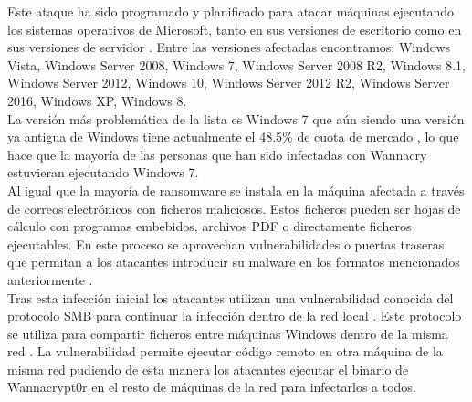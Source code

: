 Este ataque ha sido programado y planificado para atacar máquinas ejecutando los sistemas operativos de Microsoft, tanto en sus versiones de escritorio como en sus versiones de servidor \cite{plataformas-contagio-2}. Entre las versiones afectadas encontramos: Windows Vista, Windows Server 2008, Windows 7, Windows Server 2008 R2, Windows 8.1, Windows Server 2012, Windows 10, Windows Server 2012 R2, Windows Server 2016, Windows XP, Windows 8.\\
La versión más problemática de la lista es Windows 7 que aún siendo una versión ya antigua de Windows tiene actualmente el 48.5\% de cuota de mercado \cite{plataformas-contagio-3}, lo que hace que la mayoría de las personas que han sido infectadas con Wannacry estuvieran ejecutando Windows 7.\\
Al igual que la mayoría de ransomware se instala en la máquina afectada a través de correos electrónicos con ficheros maliciosos. Estos ficheros pueden ser hojas de cálculo con programas embebidos, archivos PDF o directamente ficheros ejecutables. En este proceso se aprovechan vulnerabilidades o puertas traseras que permitan a los atacantes introducir su malware en los formatos mencionados anteriormente \cite{plataformas-contagio-1}.\\
Tras esta infección inicial los atacantes utilizan una vulnerabilidad conocida del protocolo SMB para continuar la infección dentro de la red local \cite{plataformas-contagio-4}. Este protocolo se utiliza para compartir ficheros entre máquinas Windows dentro de la misma red \cite{plataformas-contagio-5}. La vulnerabilidad permite ejecutar código remoto en otra máquina de la misma red pudiendo de esta manera los atacantes ejecutar el binario de Wannacrypt0r en el resto de máquinas de la red para infectarlos a todos.